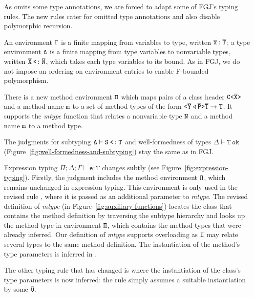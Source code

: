 As \TFGJ omits some type annotations, we are forced to adapt some of 
FGJ's typing rules. The new rules cater for omitted type annotations
and also disable polymorphic recursion.

An environment ${\tt \Gamma}$ is a finite mapping from variables to type,
written $\overline{\tt x}:\overline{\tt T}$; a type environment ${\tt \Delta}$ is a finite mapping
from type variables to nonvariable types, written $\overline{\tt X}\mathbin{\texttt{<:}}\overline{\tt N}$, which takes each type variables to its bound. As in FGJ, we do not
impose an ordering on environment entries to enable F-bounded
polymorphism.

There is a new method environment ${\tt \Pi}$ which maps pairs of a class header
$\mathtt{C \texttt{<} \overline{\tt X} \texttt{>} }$ and a method name ${\tt m}$ to a set of method
types of the form $\mathtt{ \texttt{<} \overline{\tt Y} \triangleleft  \overline{\tt P} \texttt{>} } \overline{\tt T} \to {\tt T}$. 
It supports the \textit{mtype} function that relates a nonvariable type
${\tt N}$ and a method name ${\tt m}$ to a method type.

The judgments for subtyping $\mathtt{\Delta \vdash S \mathbin{\texttt{<:}} T}$ and
well-formedness of types $\mathtt{\Delta \vdash T\ \mathtt{ok}}$
(Figure~\ref{fig:well-formedness-and-subtyping}) stay the same as in
FGJ.

Expression typing $\mathtt{\Pi; \Delta; \Gamma \vdash e
  : T}$ changes subtly (see
Figure~\ref{fig:expression-typing}). Firstly, the judgment includes
the method 
environment ${\tt \Pi}$, which remains unchanged in expression
typing. This environment is only used in the revised rule
, where it is passed as an additional parameter to
\textit{mtype}. The revised definition of \textit{mtype} (in
Figure~\ref{fig:auxiliary-functions}) locates the class that contains
the method definition by traversing the subtype hierarchy and looks up the
method type in environment ${\tt \Pi}$, which contains the method types
that were already inferred. Our definition of \textit{mtype} supports
overloading as ${\tt \Pi}$ may relate several types to the same method
definition. The instantiation of the method's type parameters is
inferred in \TFGJ.

The other typing rule that has changed is  where the
instantiation of the class's type parameters is now inferred: the rule
simply assumes a suitable instantiation by some $\overline{\tt U}$.



